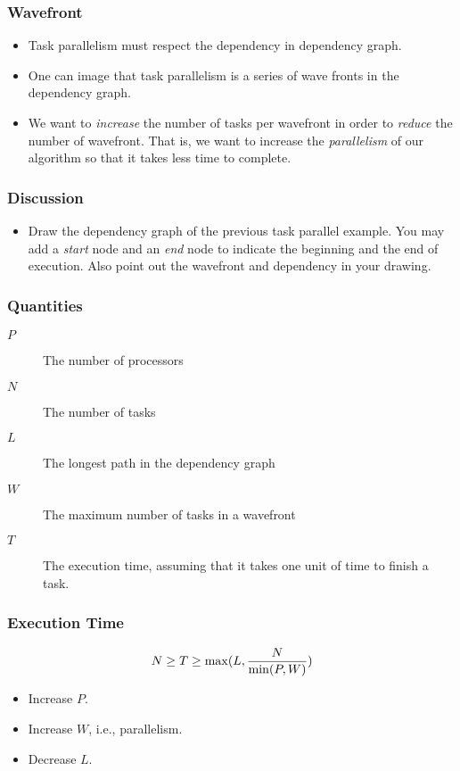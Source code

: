 \documentclass{beamer}
\begin{document}
\begin{CJK}{UTF8}{bsmi}
\begin{frame}
\frametitle{Wavefront}
\begin{itemize}
\item Task parallelism must respect the dependency in dependency graph.
\item One can image that task parallelism is a series of wave fronts
  in the dependency graph.  
\item We want to {\em increase} the number of tasks per wavefront in
  order to {\em reduce} the number of wavefront.  That is, we want to
  increase the {\em parallelism} of our algorithm so that it takes
  less time to complete.
\end{itemize}
\end{frame}

\begin{frame}
\frametitle{Discussion} 
\begin{itemize}
\item Draw the dependency graph of the previous task parallel example.
  You may add a {\em start} node and an {\em end} node to indicate the
  beginning and the end of execution.  Also point out the wavefront
  and dependency in your drawing.
\end{itemize}
\end{frame}


\begin{frame}
\frametitle{Quantities} 
\begin{description}
\item [$P$] The number of processors
\item [$N$] The number of tasks 
\item [$L$] The longest path in the dependency graph
\item [$W$] The maximum number of tasks in a wavefront
\item [$T$] The execution time, assuming that it takes one unit of
  time to finish a task.
\end{description}
\end{frame}

\begin{frame}
\frametitle{Execution Time} 
\begin{equation}
N \geq T \ge \max(L, {N \over {\min(P, W)}})
\end{equation}
\begin{itemize}
\item Increase $P$.
\item Increase $W$, i.e., parallelism.
\item Decrease $L$.
\end{itemize}
\end{frame}


\end{CJK}
\end{document}

